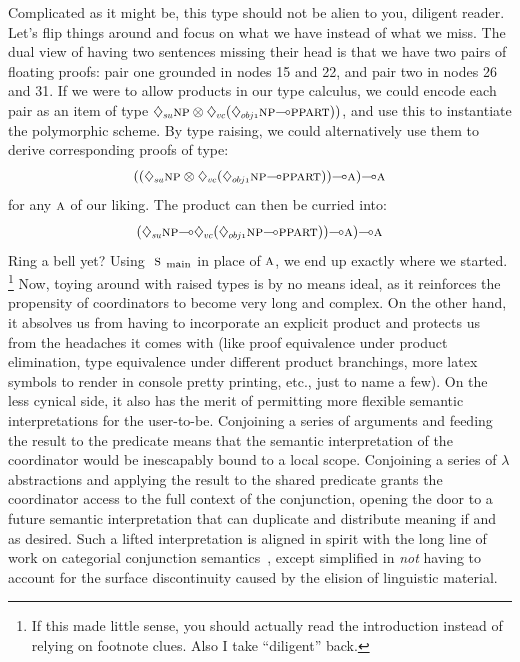 Complicated as it might be, this type should not be alien to you, diligent reader.
Let's flip things around and focus on what we have instead of what we miss.
The dual view of having two sentences missing their head is that we have two pairs of floating proofs: pair one grounded in nodes 15 and 22, and pair two in nodes 26 and 31.
If we were to allow products in our type calculus, we could encode each pair as an item of type $\ddia{su}\np[s]\otimes\ddia{vc}(\ddia{obj1}\np[s]\li\ppart[s]))$, and use this to instantiate the polymorphic scheme.
By type raising, we could alternatively use them to derive corresponding proofs of type:
\begin{equation*}
((\ddia{su}\np[s]\otimes\ddia{vc}(\ddia{obj1}\np[s]\li\ppart[s]))\li\smallgtype{a})\li\smallgtype{a}
\end{equation*}
for any $\textsc{\normalfont\textsc{a}}$ of our liking.
The product can then be curried into:
\begin{equation*}
(\ddia{su}\np[s]\li\ddia{vc}(\ddia{obj1}\np[s]\li\ppart[s]))\li\smallgtype{a})\li\smallgtype{a}
\end{equation*}
Ring a bell yet?
Using $\smain[s]$ in place of $\textsc{\normalfont\textsc{a}}$, we end up exactly where we started.%
	\footnote{If this made little sense, you should actually read the introduction instead of relying on footnote clues.
	Also I take ``diligent'' back.}
Now, toying around with raised types is by no means ideal, as it reinforces the propensity of coordinators to become very long and complex.
On the other hand, it absolves us from having to incorporate an explicit product and protects us from the headaches it comes with (like proof equivalence under product elimination, type equivalence under different product branchings, more latex symbols to render in console pretty printing, etc., just to name a few).
On the less cynical side, it also has the merit of permitting more flexible semantic interpretations for the user-to-be.
Conjoining a series of arguments and feeding the result to the predicate means that the semantic interpretation of the coordinator would be inescapably bound to a local scope.
Conjoining a series of $\lambda$ abstractions and applying the result to the shared predicate grants the coordinator access to the full context of the conjunction, opening the door to a future semantic interpretation that can duplicate and distribute meaning if and as desired.
Such a lifted interpretation is aligned in spirit with the long line of work on categorial conjunction semantics~\citet[inter alia]{oehrle1987boolean,hendriks1995ellipsis}, except simplified in \textit{not} having to account for the surface discontinuity caused by the elision of linguistic material.

